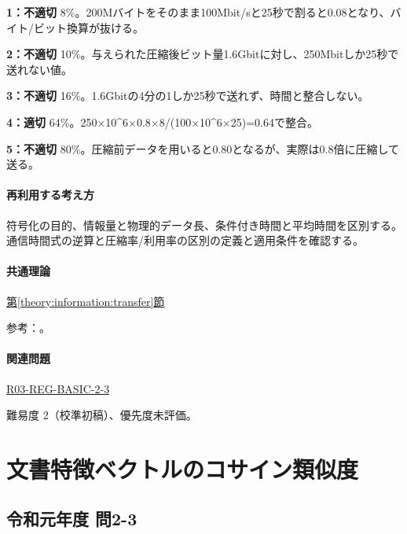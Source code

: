 \noindent\textbf{1：不適切} 8\%。200Mバイトをそのまま100Mbit/sと25秒で割ると0.08となり、バイト/ビット換算が抜ける。\par

\noindent\textbf{2：不適切} 10\%。与えられた圧縮後ビット量1.6Gbitに対し、250Mbitしか25秒で送れない値。\par

\noindent\textbf{3：不適切} 16\%。1.6Gbitの4分の1しか25秒で送れず、時間と整合しない。\par

\noindent\textbf{4：適切} 64\%。250×10\textasciicircum{}6×0.8×8/(100×10\textasciicircum{}6×25)=\allowbreak{}0.64で整合。\par

\noindent\textbf{5：不適切} 80\%。圧縮前データを用いると0.80となるが、実際は0.8倍に圧縮して送る。\par

\paragraph{再利用する考え方} 符号化の目的、情報量と物理的データ長、条件付き時間と平均時間を区別する。通信時間式の逆算と圧縮率/利用率の区別の定義と適用条件を確認する。

\paragraph{共通理論} \hyperref[theory:information:transfer]{第\ref*{theory:information:transfer}節}

\par 参考：\cite{info_deflate}。

\paragraph{関連問題} \hyperref[q:r03-reg-basic-2-3]{R03-REG-BASIC-2-3}

\par 難易度 2（校準初稿）、優先度未評価。

\section{文書特徴ベクトルのコサイン類似度}

\subsection{令和元年度 問2-3}
\label{q:r01-reg-basic-2-3}

